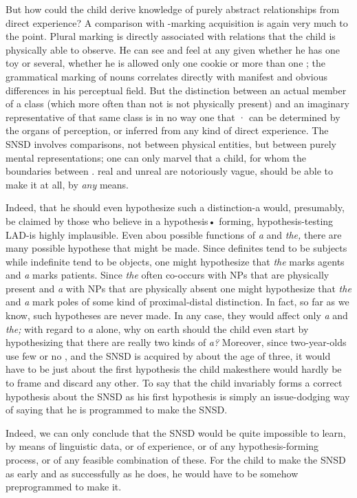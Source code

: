 But how could the child derive knowledge of purely abstract relationships from direct experience? A comparison with -marking acquisition is again very much to the point. Plural marking is directly associated with relations that the child is physically able to observe. He can see and feel at any given  whether he has one toy or several, whether he is allowed only one cookie or more than one ; the gramma\-tical marking of nouns correlates directly with manifest and obvious differences in his perceptual field. But the distinction between an actual member of a class (which more often than not is not physically present) and an imaginary representative of that same class is in no way one that · can be determined by the organs of perception, or inferred from any kind of direct experience. The SNSD involves comparisons, not between physical entities, but between purely mental representations; one can only marvel that a child, for whom the boundaries between . real and unreal are notoriously vague, should be able to make it at
all, by \textit{any} means.

Indeed, that he should even hypothesize such a distinction-a would, presumably, be claimed by those who believe in a hypothesis• forming, hypothesis-testing LAD-is highly implausible. Even abou possible functions of \textit{a} and \textit{the,} there are many possible hypothese that might be made. Since definites tend to be subjects while indefinite tend to be objects, one might hypothesize that \textit{the} marks agents and
\textit{a} marks patients. Since \textit{the} often co-occurs with NPs that are physically present and \textit{a} with NPs that are physically absent one might hy\-pothesize that \textit{the }and \textit{a} mark poles of some kind of proximal-distal distinction. In fact, so far as we know, such hypotheses are never made. In any case, they would affect only \textit{a} and \textit{the; }with regard to \textit{a} alone, why on earth should the child even start by hypothesizing that there are really two kinds of \textit{a? }Moreover, since two-year-olds use few or no , and the SNSD is acquired by about the age of three, it would have to be just about the first hypothesis the child makes\-there would hardly be  to frame and discard any other. To say that the child invariably forms a correct hypothesis about the SNSD as his first hypothesis is simply an issue-dodging way of saying that he is programmed to make the SNSD.

Indeed, we can only conclude that the SNSD would be quite impossible to learn, by means of linguistic data, or of experience, or of any hypothesis-forming process, or of any feasible combination of these. For the child to make the SNSD as early and as successfully as he does, he would have to be somehow preprogrammed to make it.

